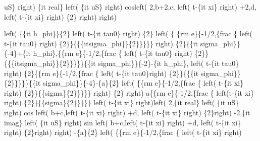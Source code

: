 \begin{maplegroup}
uS\} right) \{it real\} left( \{it uS\} right) cosleft( 2,b+2,c, left( t-\{it xi\} right) +2,d, left( t-\{it xi\} right) \{2\} right)  right)\end{maplegroup}
\begin{maplegroup}
\begin{mapleinput}
\end{mapleinput}
\mapleresult
{}left( \{\{it h\_phi\}\}\{2\} left( t-\{it tau0\} right) \{2\} left( \{
\{rm e\}\{-1/2,\{frac \{ left( t-\{it tau0\} right) \{2\}\}\{\{\{itsigma\_phi\}\}\{2\}\}\}\}\} right) \{2\}\{\{it sigma\_phi\}\}\{-4\}+\{it h\_phi\},\{\{rm e\}\{-1/2,\{frac \{ left( t-\{it tau0\} right) \{2\}\}\{\{\{itsigma\_phi\}\}\{2\}\}\}\}\}\{\{it sigma\_phi\}\}\{-2\}-\{it h\_phi\}, left( t-\{it tau0\} right) \{2\}\{\{rm e\}\{-1/2,\{frac \{ left( t-\{it tau0\}right) \{2\}\}\{\{\{it sigma\_phi\}\}\{2\}\}\}\}\}\{\{it sigma\_phi\}\}\{-4\}-\{a\}\{2\} left( \{\{rm e\}\{-1/2,\{frac \{ left( t-\{it xi\} right) \{2\}\}\{\{sigma\}\{2\}\}\}\}\} right) \{2\} right) a\{\{rm e\}\{-1/2,\{frac \{ left(t-\{it xi\} right) \{2\}\}\{\{sigma\}\{2\}\}\}\}\} left( t-\{it xi\} right)left( 2,\{it real\} left( \{it uS\} right) cos left( b+c,left( t-\{it xi\} right) +d, left( t-\{it xi\} right) \{2\}right) -2,\{it imag\} left( \{it uS\} right) sin left( b+c,left( t-\{it xi\} right) +d, left( t-\{it xi\} right) \{2\}right)  right) -\{a\}\{2\} left( \{\{rm e\}\{-1/2,\{frac \{ left( t-\{it xi\} right) 
\end{maplegroup}
